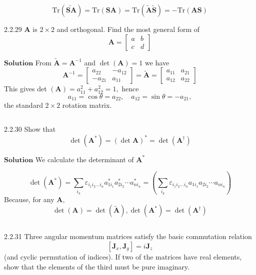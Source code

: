 $$\text{Tr}(\widetilde{\mathbf{SA}})=\text{Tr}(\mathbf{SA})=\text{Tr}(\tilde{\mathbf{A}} \tilde{\mathbf{S}})=-\text{Tr}(\mathbf{AS})$$



\newpage


\begin{mybox}{2.2.29}
$\mathbf{A}$ is $2 \times 2$ and orthogonal. Find the most general form of
$$
\mathbf{A}=\begin{bmatrix}{a} & {b} \\ {c} & {d}\end{bmatrix}
$$
\end{mybox}

$\boxed{\textbf{Solution}}$  From $\tilde{\mathbf{A}}=\mathbf{A}^{-1}$ and $\operatorname{det}(\mathbf{A})=1$ we have
$$
\mathbf{A}^{-1}=\begin{bmatrix}{a_{22}} & {-a_{12}} \\ {-a_{21}} & {a_{11}}\end{bmatrix}=\tilde{\mathbf{A}}=\begin{bmatrix}{a_{11}} & {a_{21}} \\ {a_{12}} & {a_{22}}\end{bmatrix}
$$
This gives det $(\mathbf{A})=a_{11}^{2}+a_{12}^{2}=1,$ hence 
$$a_{11}=\cos \theta=a_{22},\quad  a_{12}=\sin \theta=-a_{21},$$
the standard $2 \times 2$ rotation matrix.

$$$$

\begin{mybox}{2.2.30}
Show that
$$
\operatorname{det}\left(\mathbf{A}^{*}\right)=(\operatorname{det} \mathbf{A})^{*}=\operatorname{det}\left(\mathbf{A}^{\dagger}\right)
$$
\end{mybox}


$\boxed{\textbf{Solution}}$  We calculate the determinant of $\mathbf{A}^{*}$

$$\operatorname{det}\left(\mathbf{A}^{*}\right)=\sum_{i_{k}} \varepsilon_{i_{1} i_{2} \ldots i_{n}} a_{1 i_{1}}^{*} a_{2 i_{2}}^{*} \cdots a_{n i_{n}}^{*}=\left(\sum_{i_{k}} \varepsilon_{i_{1} i_{2} \ldots i_{n}} a_{1 i_{1}} a_{2 i_{2}} \cdots a_{n i_{n}}\right)$$
Because, for any $\mathbf{A},$ 
$$\operatorname{det}(\mathbf{A})=\operatorname{det}(\tilde{\mathbf{A}}), \operatorname{det}\left(\mathbf{A}^{*}\right)=\operatorname{det}\left(\mathbf{A}^{\dagger}\right)$$

$$$$

\begin{mybox}{2.2.31}
Three angular momentum matrices satisfy the basic commutation relation
$$[\mathbf{J}_x, \mathbf{J}_y] = i\mathbf{J}_z$$
(and cyclic permutation of indices). If two of the matrices have real elements, show that
the elements of the third must be pure imaginary.
\end{mybox}

